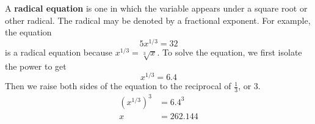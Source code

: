 \documentclass[10pt,]{book}
\newcommand{\terminology}[1]{\textbf{#1}}
\theoremstyle{plain}
\theoremstyle{definition}
\theoremstyle{definition}
\theoremstyle{definition}
\theoremstyle{definition}
\theoremstyle{definition}
\numberwithin{equation}{section}
\newcommand{\amp}{ & }
\begin{document}
    A \terminology{radical equation} is one in which the variable appears under a square root or other radical. The radical may be denoted by a fractional exponent. For example, the equation
    \begin{equation*}5x^{1/3} = 32\end{equation*}
    is a radical equation because \(x^{1/3} = \sqrt[3]{x}\). To solve the equation, we first isolate the power to get
    \begin{equation*}x^{1/3} = 6.4\end{equation*}
    Then we raise both sides of the equation to the reciprocal of \(\frac{1}{3}\), or 3.
    \begin{align*}
    \left(x^{1/3}\right)^3 \amp = 6.4^3 \\
    x \amp = 262.144
    \end{align*}
%
\end{document}

